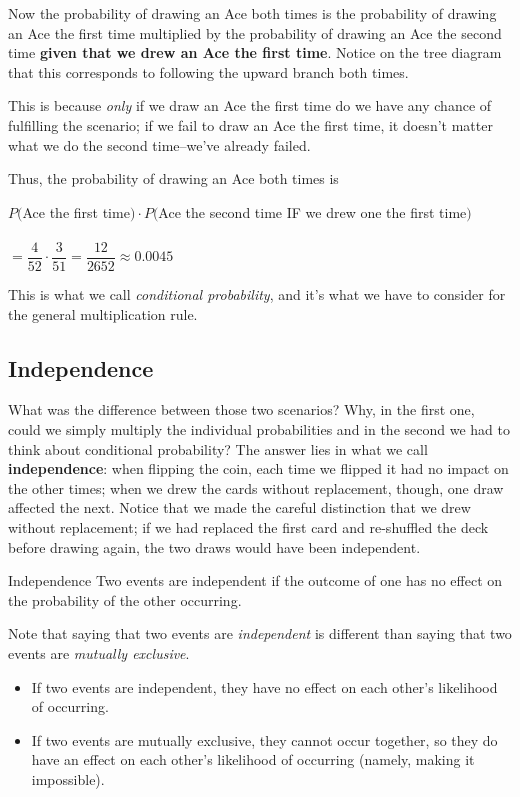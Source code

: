 Now the probability of drawing an Ace both times is the probability of drawing an Ace the first time multiplied by the probability of drawing an Ace the second time \textbf{given that we drew an Ace the first time}.  Notice on the tree diagram that this corresponds to following the upward branch both times.

This is because \emph{only} if we draw an Ace the first time do we have any chance of fulfilling the scenario; if we fail to draw an Ace the first time, it doesn't matter what we do the second time--we've already failed.

Thus, the probability of drawing an Ace both times is 
\begin{center}
$P($Ace the first time$) \cdot P($Ace the second time IF we drew one the first time$)$\\
\text{}\\
$= \dfrac{4}{52} \cdot \dfrac{3}{51} = \dfrac{12}{2652} \approx 0.0045$
\end{center}

This is what we call \emph{conditional probability}, and it's what we have to consider for the general multiplication rule.

\subsection{Independence}
What was the difference between those two scenarios?  Why, in the first one, could we simply multiply the individual probabilities and in the second we had to think about conditional probability?  The answer lies in what we call \textbf{independence}: when flipping the coin, each time we flipped it had no impact on the other times; when we drew the cards without replacement, though, one draw affected the next.  Notice that we made the careful distinction that we drew without replacement; if we had replaced the first card and re-shuffled the deck before drawing again, the two draws would have been independent.

\begin{proc}{Independence}
Two events are independent if the outcome of one has no effect on the probability of the other occurring.
\end{proc}

Note that saying that two events are \emph{independent} is different than saying that two events are \emph{mutually exclusive}.
\begin{itemize}
\item If two events are independent, they have no effect on each other's likelihood of occurring.
\item If two events are mutually exclusive, they cannot occur together, so they do have an effect on each other's likelihood of occurring (namely, making it impossible).
\end{itemize}
\pagebreak

